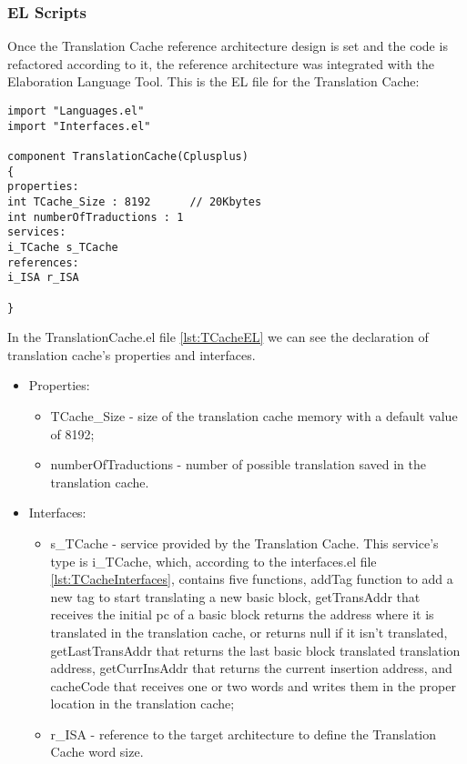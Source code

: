 \subsubsection{EL Scripts}
Once the Translation Cache reference architecture design is set and the code is refactored according to it, the reference architecture was integrated with the Elaboration Language Tool. This is the EL file for the Translation Cache:

\begin{lstlisting}[caption={Translation Cache EL file}, label={lst:TCacheEL},language=EL]
import "Languages.el"
import "Interfaces.el"

component TranslationCache(Cplusplus)
{
properties:
int TCache_Size : 8192 		// 20Kbytes
int numberOfTraductions : 1	
services:
i_TCache s_TCache
references:
i_ISA r_ISA

}
\end{lstlisting}

In the TranslationCache.el file \ref{lst:TCacheEL} we can see the declaration of translation cache's properties and interfaces.

\begin{itemize}
	\item Properties:
	\begin{itemize}
		\item 	TCache\_Size - size of the translation cache memory with a default value of 8192;
		\item	numberOfTraductions - number of possible translation saved in the translation cache.
	\end{itemize}
	\item Interfaces:
	\begin{itemize}
		\item 	s\_TCache - service provided by the Translation Cache. This service's type is i\_TCache, which, according to the interfaces.el file \ref{lst:TCacheInterfaces}, contains five functions, addTag function to add a new tag to start translating a new basic block, getTransAddr	that receives the initial pc of a basic block returns the address where it is translated in the translation cache, or returns null if it isn't translated,	getLastTransAddr that returns the last basic block translated translation address, getCurrInsAddr that returns the current insertion address, and cacheCode that receives one or two words and writes them in the proper location in the translation cache;
		\item	r\_ISA - reference to the target architecture to define the Translation Cache word size.			
	\end{itemize}
\end{itemize}


